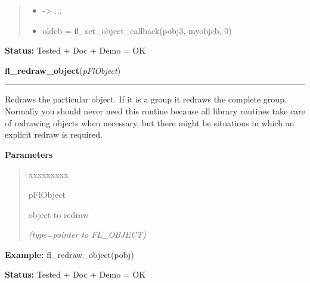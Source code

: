 \begin{boxedminipage}{\funcwidth}
\begin{quote}
\begin{itemize}
  \item {\textbar}-{\textgreater}{\textbar} ...



  \item oldcb = fl\_set\_object\_callback(pobj3, myobjcb, 0)



\end{itemize}

\end{quote}

\textbf{Status:} Tested + Doc + Demo = OK



    \end{boxedminipage}

    \label{xformslib:flbasic:fl_redraw_object}

    \vspace{0.5ex}

\hspace{.8\funcindent}\begin{boxedminipage}{\funcwidth}

    \raggedright \textbf{fl\_redraw\_object}(\textit{pFlObject})

    \vspace{-1.5ex}

    \rule{\textwidth}{0.5\fboxrule}
\setlength{\parskip}{2ex}
    Redraws the particular object. If it is a group it redraws the complete
    group. Normally you should never need this routine because all library 
    routines take care of redrawing objects when necessary, but there might
    be situations in which an explicit redraw is required.

\setlength{\parskip}{1ex}
      \textbf{Parameters}
      \vspace{-1ex}

      \begin{quote}
        \begin{Ventry}{xxxxxxxxx}

          \item[pFlObject]

          object to redraw

            {\it (type=pointer to FL\_OBJECT)}

        \end{Ventry}

      \end{quote}

\textbf{Example:} fl\_redraw\_object(pobj)



\textbf{Status:} Tested + Doc + Demo = OK



    \end{boxedminipage}

